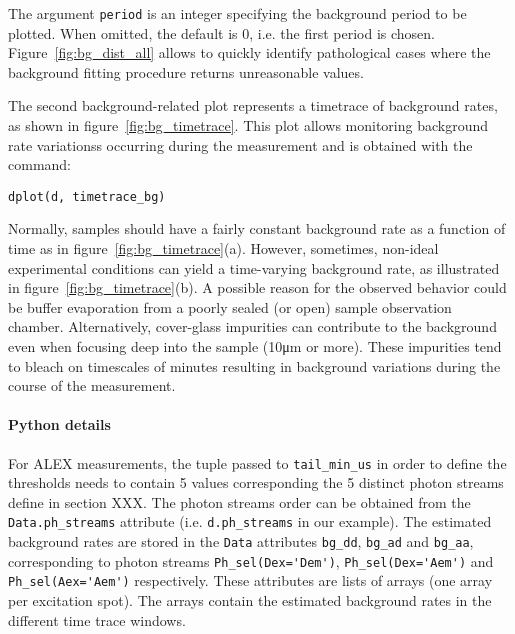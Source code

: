 The argument \verb|period| is an integer specifying the background period to be plotted.
When omitted, the default is 0, i.e. the first period is chosen.
Figure~\ref{fig:bg_dist_all} allows to quickly identify pathological cases where the 
background fitting procedure returns unreasonable values. 

The second background-related plot represents a timetrace of background rates, 
as shown in figure~\ref{fig:bg_timetrace}. This plot allows monitoring background rate variationss
occurring during the measurement and is obtained with the command:

\begin{lstlisting}
dplot(d, timetrace_bg)
\end{lstlisting}

Normally, samples should have a fairly constant background rate as a function of time
as in figure~\ref{fig:bg_timetrace}(a). However, sometimes, non-ideal
experimental conditions can yield a time-varying background rate, as illustrated in
figure~\ref{fig:bg_timetrace}(b).
A possible reason for the observed behavior could be buffer evaporation from a poorly sealed (or open) sample observation chamber. Alternatively,
cover-glass impurities can contribute to the background even when focusing 
deep into the sample (10μm or more).
These impurities tend to bleach on timescales of minutes resulting in
background variations during the course of the measurement.
\paragraph{Python details} For ALEX measurements, the tuple passed to
\verb|tail_min_us| in order to define the thresholds needs to contain  
5 values corresponding the 5 distinct photon streams define in section XXX.
The photon streams order can be obtained from
the \verb|Data.ph_streams| attribute (i.e. \verb|d.ph_streams| in our example).
The estimated background rates are stored in the \verb|Data| attributes
\verb|bg_dd|, \verb|bg_ad| and \verb|bg_aa|, corresponding to photon
streams \verb|Ph_sel(Dex='Dem')|, \verb|Ph_sel(Dex='Aem')| and \verb|Ph_sel(Aex='Aem')|
respectively.
These attributes are lists of arrays (one array per excitation spot).
The arrays contain the estimated background rates in the different time trace windows.

